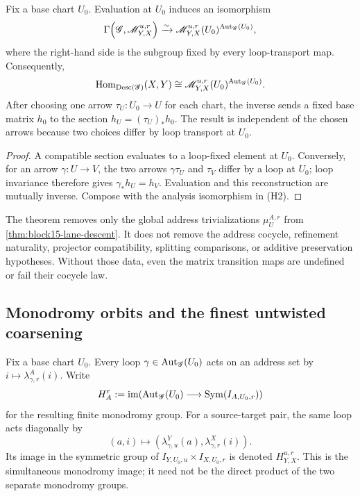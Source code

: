 \begin{corollary}
\label{cor:block16-base-fiber-invariant-normal-form}
Fix a base chart \(U_0\).  Evaluation at \(U_0\) induces an isomorphism
\[
 \Gamma\!\left(\mathscr G,\mathscr M^{u,r}_{Y,X}\right)
 \xrightarrow{\sim}
 \mathscr M^{u,r}_{Y,X}(U_0)^{\operatorname{Aut}_{\mathscr G}(U_0)},
\]
where the right-hand side is the subgroup fixed by every loop-transport map.
Consequently,
\[
 \operatorname{Hom}_{\operatorname{Desc}(\mathscr G)}(X,Y)
 \cong
 \mathscr M^{u,r}_{Y,X}(U_0)^{\operatorname{Aut}_{\mathscr G}(U_0)}.
\]
After choosing one arrow \(\tau_U:U_0\to U\) for each chart, the inverse sends
a fixed base matrix \(h_0\) to the section
\(h_U=(\tau_U)_*h_0\).  The result is independent of the chosen arrows because
two choices differ by loop transport at \(U_0\).
\end{corollary}

\begin{proof}
A compatible section evaluates to a loop-fixed element at \(U_0\).  Conversely,
for an arrow \(\gamma:U\to V\), the two arrows
\(\gamma\tau_U\) and \(\tau_V\) differ by a loop at \(U_0\); loop invariance
therefore gives \(\gamma_*h_U=h_V\).  Evaluation and this reconstruction are
mutually inverse.  Compose with the analysis isomorphism in (H2).
\end{proof}

\begin{remark}
\label{rem:block16-removed-triviality-only}
The theorem removes only the global address trivializations
\(\mu_U^{A,r}\) from \cref{thm:block15-lane-descent}.  It does not remove the
address cocycle, refinement naturality, projector compatibility, splitting
comparisons, or additive preservation hypotheses.  Without those data, even
the matrix transition maps are undefined or fail their cocycle law.
\end{remark}

\subsection{Monodromy orbits and the finest untwisted coarsening}
\label{subsec:block16-orbit-descent}

Fix a base chart \(U_0\).  Every loop \(\gamma\in\operatorname{Aut}_{\mathscr G}(U_0)\)
acts on an address set by \(i\mapsto\lambda^A_{\gamma,r}(i)\).  Write
\[
 H_A^r
 :=
 \operatorname{im}\!\left(
 \operatorname{Aut}_{\mathscr G}(U_0)
 \longrightarrow
 \operatorname{Sym}(I_{A,U_0,r})
 \right)
\]
for the resulting finite monodromy group.  For a source-target pair, the same
loop acts diagonally by
\[
 (a,i)\longmapsto
 \left(\lambda^Y_{\gamma,u}(a),
 \lambda^X_{\gamma,r}(i)\right).
\]
Its image in the symmetric group of
\(I_{Y,U_0,u}\times I_{X,U_0,r}\) is denoted
\(H_{Y,X}^{u,r}\).  This is the simultaneous monodromy image; it need not be
the direct product of the two separate monodromy groups.


